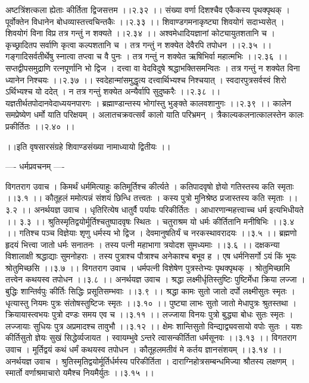\documentclass[11pt]{book}
\begin{document}
\begin{landscape}
अष्टत्रिंशत्कला ह्येताः कीर्तिता द्विजसत्तम ।।२.३२ ।।
संख्या वर्णा दिशश्चैव एकैकस्य पृथक्पृथक् ।
पूर्वोक्तेन विधानेन बोधव्यास्तत्त्वचिन्तकैः ।।२.३३ ।।
शिवाण्डगमनाकृष्ट्या शिवयोगं सदाभ्यसेत् ।
शिवयोगं विना विप्र तत्र गन्तुं न शक्यते ।।२.३४ ।।
अश्वमेधादियज्ञानां कोट्यायुतशतानि च ।
कृच्छ्रादितप सर्वाणि कृत्वा कल्पशतानि च ।
तत्र गन्तुं न शक्येत देवैरपि तपोधन ।।२.३५ ।।
गङ्गादिसर्वतीर्थेषु स्नात्वा तप्त्वा च वै पुनः ।
तत्र गन्तुं न शक्येत ऋषिभिर्वा महात्मभिः ।।२.३६ ।।
सप्तद्वीपसमुद्राणि रत्नपूर्णानि भो द्विज ।
दत्त्वा वा वेदविदुषे श्रद्धाभक्तिसमन्वितः ।
तत्र गन्तुं न शक्येत विना ध्यानेन निश्चयः ।।२.३७ ।।
स्वदेहान्मांसमुद्धृत्य दत्त्वार्थिभ्यश्च निश्चयात् ।
स्वदारपुत्रसर्वस्वं शिरो ऽर्थिभ्यश्च यो ददेत् ।
न तत्र गन्तुं शक्येत अन्यैर्वापि सुदुष्करैः ।।२.३८ ।।
यज्ञतीर्थतपोदानवेदाध्ययनपारगः ।
ब्रह्माण्डान्तस्य भोगांस्तु भुङ्क्ते कालवशानुगः ।।२.३९ ।।
कालेन समप्रेष्येण धर्मो याति परिक्षयम् ।
अलातचक्रवत्सर्वं कालो याति परिभ्रमन् ।
त्रैकाल्यकलनात्कालस्तेन कालः प्रकीर्तितः ।।२.४० ।।

 ।।इति वृषसारसंग्रहे शिवाण्डसंख्या नामाध्यायो द्वितीयः ।।





---- धर्मप्रवचनम् ----

विगतराग उवाच ।
किमर्थं धर्ममित्याहुः कतिमूर्तिश्च कीर्त्यते ।
कतिपादवृषो ज्ञेयो गतिस्तस्य कति स्मृताः ।।३.१ ।।
कौतूहलं ममोत्पन्नं संशयं छिन्धि तत्त्वतः ।
कस्य पुत्रो मुनिश्रेष्ठ प्रजास्तस्य कति स्मृताः ।।३.२ ।।
अनर्थयज्ञ उवाच ।
धृतिरित्येष धातुर्वै पर्यायः परिकीर्तितः ।
आधारणान्महत्त्वाच्च धर्म इत्यभिधीयते ।। ३.३ ।।
श्रुतिस्मृतिद्वयोर्मूर्तिश्चतुष्पादवृषः स्थितः ।
चतुराश्रम यो धर्मः कीर्तितानि मनीषिभिः ।।३.४ ।।
गतिश्च पञ्च विज्ञेयाः शृणु धर्मस्य भो द्विज ।
देवमानुषतिर्यं च नरकस्थावरादयः ।।३.५ ।।
ब्रह्मणो हृदयं भित्त्वा जातो धर्मः सनातनः ।
तस्य पत्नी महाभागा त्रयोदश सुमध्यमाः ।।३.६ ।।
दक्षकन्या विशालाक्षी श्रद्धाद्याः सुमनोहराः ।
तस्य पुत्राश्च पौत्राश्च अनेकाश्च बभूव ह ।
एष धर्मनिसर्गो ऽयं किं भूयः श्रोतुमिच्छसि ।।३.७ ।।
विगतराग उवाच ।
धर्मपत्नी विशेषेण पुत्रस्तेभ्यः पृथक्पृथक् ।
श्रोतुमिच्छामि तत्त्वेन कथयस्व तपोधन ।।३.८ ।।
अनर्थयज्ञ उवाच ।
श्रद्धा लक्ष्मीर्धृतिस्तुष्टिः पुष्टिर्मेधा क्रिया लज्जा ।
बुद्धिः शान्तिर्वपुः कीर्तिः सिद्धिः प्रसूतिसम्भवाः ।।३.९ ।।
श्रद्धा कामः सुतो जातो दर्पो लक्ष्मीसुतः स्मृतः ।
धृत्यास्तु नियमः पुत्रः संतोषस्तुष्टिजः स्मृतः ।।३.१० ।।
पुष्ट्या लाभः सुतो जातो मेधापुत्रः श्रुतस्तथा ।
क्रियायास्त्वभयः पुत्रो दण्डः समय एव च ।।३.११ ।।
लज्जाया विनयः पुत्रो बुद्ध्या बोधः सुतः स्मृतः ।
लज्जायाः सुधियः पुत्र अप्रमादश्च तावुभौ ।।३.१२ ।।
क्षेमः शान्तिसुतो विन्द्याद्व्यवसायो वपोः सुतः ।
यशः कीर्तिसुतो ज्ञेयः सुखं सिद्धेर्व्यजायत ।
स्वायम्भुवे ऽन्तरे त्वासन्कीर्तिता धर्मसूनवः ।।३.१३ ।।
विगतराग उवाच ।
मूर्तिद्वयं कथं धर्मं कथयस्व तपोधन ।
कौतूहलमतीवं मे कर्तय ज्ञानसंशयम् ।।३.१४ ।।
अनर्थयज्ञ उवाच ।
श्रुतिस्मृतिद्वयोर्मूर्तिर्धर्मस्य परिकीर्तिता ।
दाराग्निहोत्रसम्बन्धमिज्या श्रौतस्य लक्षणम् ।
स्मार्तो वर्णाश्रमाचारो यमैश्च नियमैर्युतः ।।३.१५ ।।


\end{landscape}
\end{document}
